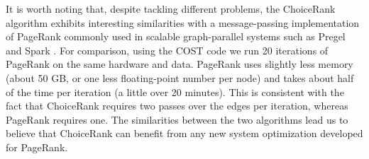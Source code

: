 It is worth noting that, despite tackling different problems, the ChoiceRank algorithm exhibits interesting similarities with a message-passing implementation of PageRank commonly used in scalable graph-parallel systems such as Pregel \citep{malewicz2010pregel} and Spark \citep{gonzalez2014graphx}.
For comparison, using the COST code \citep{mcsherry2015scalability} we run \num{20} iterations of PageRank on the same hardware and data.
PageRank uses slightly less memory (about \num{50} GB, or one less floating-point number per node) and takes about half of the time per iteration (a little over \num{20} minutes).
This is consistent with the fact that ChoiceRank requires two passes over the edges per iteration, whereas PageRank requires one.
The similarities between the two algorithms lead us to believe that ChoiceRank can benefit from any new system optimization developed for PageRank.
